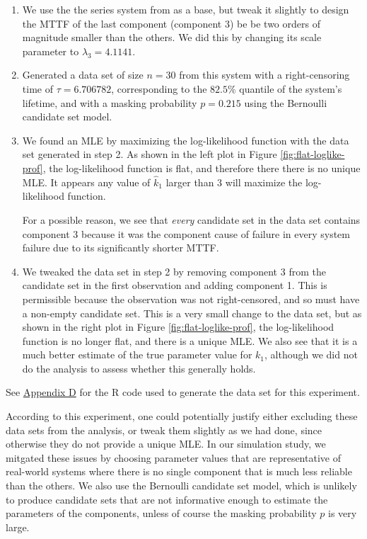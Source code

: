\documentclass[
]{article}
\begin{document}
\begin{enumerate}
\def\labelenumi{\arabic{enumi}.}
\item
  We use the the series system from \citep{Huairu-2013} as a base, but
  tweak it slightly to design the MTTF of the last component (component
  3) be be two orders of magnitude smaller than the others. We did this
  by changing its scale parameter to \(\lambda_3 = 4.1141\).
\item
  Generated a data set of size \(n = 30\) from this system with a
  right-censoring time of \(\tau = 6.706782\), corresponding to the
  \(82.5\%\) quantile of the system's lifetime, and with a masking
  probability \(p = 0.215\) using the Bernoulli candidate set model.
\item
  We found an MLE by maximizing the log-likelihood function with the
  data set generated in step 2. As shown in the left plot in Figure
  \ref{fig:flat-loglike-prof}, the log-likelihood function is flat, and
  therefore there there is no unique MLE. It appears any value of
  \(\hat k_1\) larger than \(3\) will maximize the log-likelihood
  function.

  For a possible reason, we see that \emph{every} candidate set in the
  data set contains component 3 because it was the component cause of
  failure in every system failure due to its significantly shorter MTTF.
\item
  We tweaked the data set in step 2 by removing component 3 from the
  candidate set in the first observation and adding component 1. This is
  permissible because the observation was not right-censored, and so
  must have a non-empty candidate set. This is a very small change to
  the data set, but as shown in the right plot in Figure
  \ref{fig:flat-loglike-prof}, the log-likelihood function is no longer
  flat, and there is a unique MLE. We also see that it is a much better
  estimate of the true parameter value for \(k_1\), although we did not
  do the analysis to assess whether this generally holds.
\end{enumerate}

See \hyperref[app:flat-like-code]{Appendix D} for the R code used to
generate the data set for this experiment.

According to this experiment, one could potentially justify either
excluding these data sets from the analysis, or tweak them slightly as
we had done, since otherwise they do not provide a unique MLE. In our
simulation study, we mitgated these issues by choosing parameter values
that are representative of real-world systems where there is no single
component that is much less reliable than the others. We also use the
Bernoulli candidate set model, which is unlikely to produce candidate
sets that are not informative enough to estimate the parameters of the
components, unless of course the masking probability \(p\) is very
large.
\end{document}
